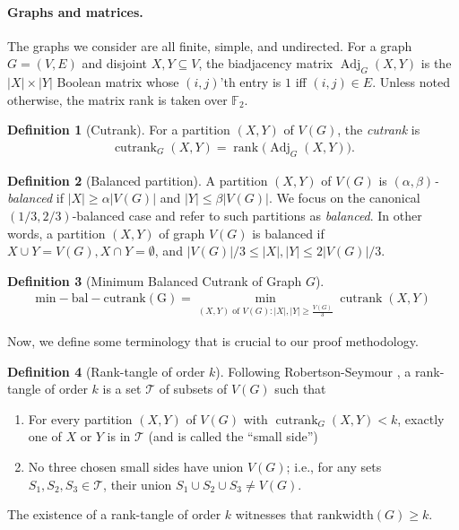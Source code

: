 \documentclass{article}
\theoremstyle{definition}
\newtheorem{definition}{Definition}[section]
\begin{document}
\paragraph{Graphs and matrices.} The graphs we consider are all finite, simple, and undirected.
For a graph $G=(V,E)$ and disjoint $X,Y\subseteq V$, the {biadjacency matrix} $\operatorname{Adj}_G(X,Y)$ is the $|X|\times|Y|$ Boolean matrix whose $(i,j)$'th entry is $1$ iff $(i,j)\in E$.  Unless noted otherwise, the matrix rank is taken over $\mathbb{F}_2$.


\begin{definition}[Cutrank]
For a partition $(X,Y)$ of $V(G)$, the \emph{cutrank} is
\begin{align}
\operatorname{cutrank}_G(X,Y)=\operatorname{rank}\bigl(\operatorname{Adj}_G(X,Y)\bigr).
\end{align}
\end{definition}


\begin{definition}[Balanced partition]
A partition $(X,Y)$ of $V(G)$ is \emph{$(\alpha,\beta)$-balanced} if $|X| \ge \alpha|V(G)|$ and $|Y|\le\beta|V(G)|$.  
We focus on the canonical $(1/3, 2/3)$-balanced case and refer to such partitions as \emph{balanced}. 
In other words, a partition $(X,Y)$ of graph $V(G)$ is balanced if $X\cup Y = V(G), X\cap Y = \emptyset$, and $|V(G)|/3 \leq |X|,|Y| \leq 2|V(G)|/3$.  
\end{definition}

\begin{definition}[Minimum Balanced Cutrank of Graph $G$]
\begin{align}
\operatorname{min-bal-cutrank(G)} = \min_{(X,Y) \text{ of $V(G):|X|, |Y| \geq \frac{V(G)}{3}$}}\operatorname{cutrank}(X,Y)\end{align}
\end{definition}

\noindent Now, we define some terminology that is crucial to our proof methodology.

\begin{definition}[Rank-tangle of order $k$] \label{def: rank-tangle of order k}
Following Robertson-Seymour \cite{ROBERTSON1991153}, a rank-tangle of order $k$ is a set $\mathcal{T}$ of subsets of $V(G)$ such that \begin{enumerate}\item For every partition $(X,Y)$ of $V(G)$ with $\operatorname{cutrank}_G(X,Y)<k$, exactly one of $X$ or $Y$ is in $\mathcal{T}$ (and is called the ``small side'')\item No three chosen small sides have union $V(G)$; i.e., for any sets $S_1, S_2, S_3 \in \mathcal{T}$, their union $S_1 \cup S_2 \cup S_3 \neq V(G)$.\end{enumerate}
The existence of a rank-tangle of order $k$ witnesses that $\mathrm{rankwidth}(G)\geq k$.
\end{definition}
\end{document}
